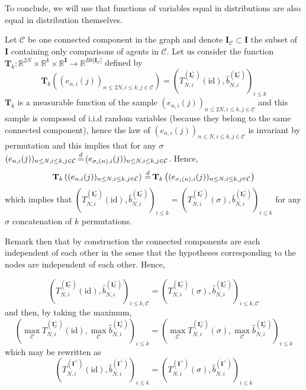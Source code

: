 \documentclass{article}
\theoremstyle{plain}
\theoremstyle{remark}
\newcommand{\R}{\mathbb{R}}
\newcommand{\1}{\mathbbm{1}}
\newcommand{\id}{\mathrm{id}}
\newcommand{\dec}{\,{\buildrel d \over =}\,}
\numberwithin{equation}{section}
\begin{document}
To conclude, we will use that functions of variables equal in distributions are also equal in distribution themselves.

Let $\mathcal{C}$ be one connected component in the graph and denote $\textbf{I}_\mathcal{C} \subset \textbf{I}$ the subset of $\textbf{I}$ containing only comparisons of agents in $\mathcal{C}$. Let us consider the function $\textbf{T}_k : \R^{2N}\times\R^k\times\R^{\textbf{I}}\to \R^{Bk|\textbf{I}_\mathcal{C}|}$ defined by 
$$\textbf{T}_k\left((e_{n,i}(j))_{n\le 2N, i\le k,j\in \mathcal{C}}\right) =(T_{N,i}^{(\textbf{I}_\mathcal{C}^+)}(\id), \widehat{b}_{N,i}^{(\textbf{I}_\mathcal{C}^+)})_{i\le k}$$
$\textbf{T}_k$ is a measurable function of the sample $(e_{n,i}(j))_{n\le 2N, i\le k,j\in \mathcal{C}}$ and this sample is composed of i.i.d random variables (because they belong to the same connected component), hence the law of $(e_{n,i}(j))_{n\le N, i\le k,j\in \mathcal{C}}$ is invariant by permutation and this implies that for any $\sigma$ $(e_{n,i}(j))_{n\le N, i\le k,j\in \mathcal{C}} \dec (e_{\sigma_i(n),i}(j))_{n\le N, i\le k,j\in \mathcal{C}}$. Hence, $$\textbf{T}_k\left((e_{n,i}(j))_{n\le N, i\le k,j\in \mathcal{C}}\right) \dec \textbf{T}_k\left((e_{\sigma_i(n),i}(j))_{n\le N, i\le k,j\in \mathcal{C}}\right)$$ 
which implies that $(T_{N,i}^{(\textbf{I}_\mathcal{C}^+)}(\id), \widehat{b}_{N,i}^{(\textbf{I}_\mathcal{C}^+)})_{i\le k}=(T_{N,i}^{(\textbf{I}_\mathcal{C}^+)}(\sigma), \widehat{b}_{N,i}^{(\textbf{I}_\mathcal{C}^+)})_{i\le k}$ for any $\sigma$ concatenation of $k$ permutations.

Remark then that by construction the connected components are each independent of each other in the sense that the hypotheses corresponding to the nodes are independent of each other. Hence, 

$$(T_{N,i}^{(\textbf{I}_\mathcal{C}^+)}(\id), \widehat{b}_{N,i}^{(\textbf{I}_\mathcal{C}^+)})_{i\le k, \mathcal{C}}=(T_{N,i}^{(\textbf{I}_\mathcal{C}^+)}(\sigma), \widehat{b}_{N,i}^{(\textbf{I}_\mathcal{C}^+)})_{i\le k, \mathcal{C}}$$
and then, by taking the maximum,
$$(\max_{\mathcal{C}}T_{N,i}^{(\textbf{I}_\mathcal{C}^+)}(\id), \max_{\mathcal{C}}\widehat{b}_{N,i}^{(\textbf{I}_\mathcal{C}^+)})_{i\le k}=(\max_{\mathcal{C}}T_{N,i}^{(\textbf{I}_\mathcal{C}^+)}(\sigma), \max_{\mathcal{C}}\widehat{b}_{N,i}^{(\textbf{I}_\mathcal{C}^+)})_{i\le k}$$
which may be rewritten as 
$$(T_{N,i}^{(\textbf{I}^+)}(\id),\widehat{b}_{N,i}^{(\textbf{I}^+)})_{i\le k}=(T_{N,i}^{(\textbf{I}^+)}(\sigma), \widehat{b}_{N,i}^{(\textbf{I}^+)})_{i\le k}$$


\end{document}
